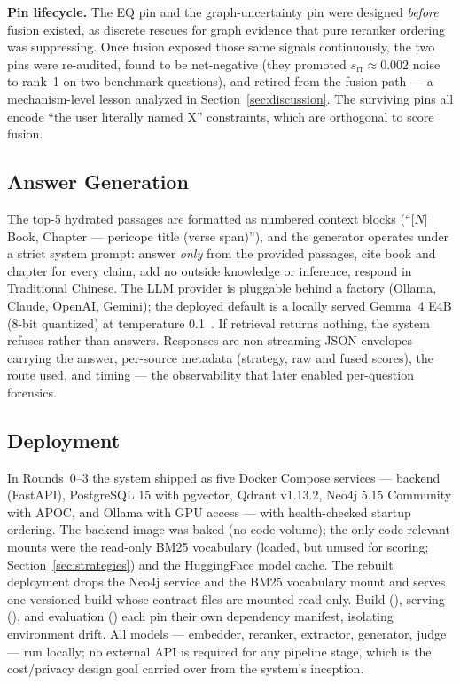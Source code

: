 \textbf{Pin lifecycle.} The EQ pin and the graph-uncertainty pin were
designed \emph{before} fusion existed, as discrete rescues for graph
evidence that pure reranker ordering was suppressing. Once fusion exposed
those same signals continuously, the two pins were re-audited, found to
be net-negative (they promoted $s_{\mathrm{rr}}\approx 0.002$ noise to
rank~1 on two benchmark questions), and retired from the fusion path ---
a mechanism-level lesson analyzed in
Section~\ref{sec:discussion}. The surviving pins all encode ``the user
literally named X'' constraints, which are orthogonal to score fusion.

\subsection{Answer Generation}
\label{sec:generation}

The top-5 hydrated passages are formatted as numbered context blocks
(``[$N$] Book, Chapter --- pericope title (verse span)''), and the
generator operates under a strict system prompt: answer \emph{only} from
the provided passages, cite book and chapter for every claim, add no
outside knowledge or inference, respond in Traditional Chinese. The LLM
provider is pluggable behind a factory (Ollama, Claude, OpenAI, Gemini);
the deployed default is a locally served Gemma~4 E4B (8-bit quantized) at
temperature 0.1~\cite{gemma4}. If retrieval returns nothing, the system
refuses rather than answers. Responses are non-streaming JSON envelopes
carrying the answer, per-source metadata (strategy, raw and fused
scores), the route used, and timing --- the observability that later
enabled per-question forensics.

\subsection{Deployment}
\label{sec:deployment}

In Rounds~0--3 the system shipped as five Docker Compose services ---
backend (FastAPI), PostgreSQL 15 with pgvector, Qdrant v1.13.2, Neo4j
5.15 Community with APOC, and Ollama with GPU access --- with
health-checked startup ordering. The backend image was baked (no code
volume); the only code-relevant mounts were the read-only BM25
vocabulary (loaded, but unused for scoring; Section~\ref{sec:strategies})
and the HuggingFace model cache. The rebuilt deployment drops the Neo4j
service and the BM25 vocabulary mount and serves one versioned build
whose contract files are mounted read-only. Build (), serving
(), and evaluation () each pin their own
dependency manifest, isolating environment drift. All models --- embedder,
reranker, extractor, generator, judge --- run locally; no external API is
required for any pipeline stage, which is the cost/privacy design goal
carried over from the system's inception.
